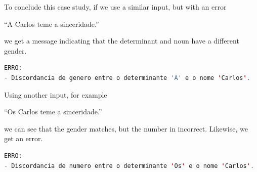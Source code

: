 
To conclude this case study, if we use a similar input, but with an error

``A Carlos teme a sinceridade.''

\noindent we get a message indicating that the determinant and noun have a different gender.

\begin{center}
\begin{minipage}{12cm}
\begin{lstlisting}[language=java, basicstyle=\small, label={lst:erro_gender_dsl_excerpt}, caption=Example of a gender error message]
ERRO:
- Discordancia de genero entre o determinante 'A' e o nome 'Carlos'.
\end{lstlisting}
\end{minipage}
\end{center}



Using another input, for example

``Os Carlos teme a sinceridade.''

\noindent we can see that the gender matches, but the number in incorrect. Likewise, we get an error.

\begin{center}
\begin{minipage}{12cm}
\begin{lstlisting}[language=java, basicstyle=\small, label={lst:erro_number_dsl_excerpt}, caption=Example of a number error message]
ERRO:
- Discordancia de numero entre o determinante 'Os' e o nome 'Carlos'.
\end{lstlisting}
\end{minipage}
\end{center}

